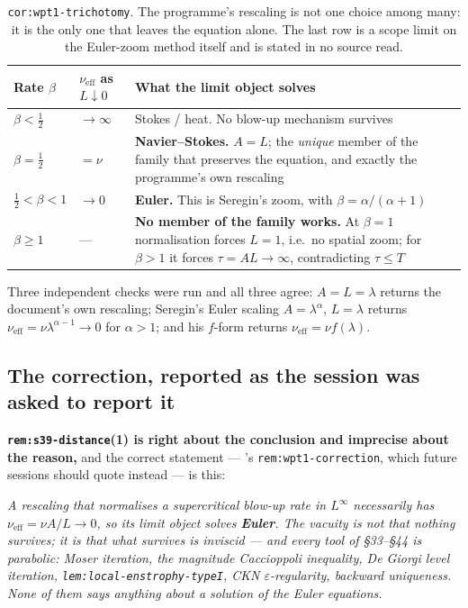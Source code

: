 \begin{table}[ht]
\centering
\small
\begin{tabular}{@{}l l p{}@{}}
\toprule
Rate \(\beta\) & \(\nu_{\mathrm{eff}}\) as \(L\downarrow0\) & What the limit
  object solves \\
\midrule
\(\beta<\tfrac12\) & \(\to\infty\)
  & Stokes / heat. No blow-up mechanism survives \\[3pt]
\(\beta=\tfrac12\) & \(=\nu\)
  & \textbf{Navier--Stokes.} \(A=L\); the \emph{unique} member of the family
    that preserves the equation, and exactly the programme's own rescaling \\[3pt]
\(\tfrac12<\beta<1\) & \(\to0\)
  & \textbf{Euler.} This is Seregin's zoom, with \(\beta=\alpha/(\alpha+1)\) \\[3pt]
\(\beta\geq1\) & ---
  & \textbf{No member of the family works.} At \(\beta=1\) normalisation forces
    \(L=1\), i.e.\ no spatial zoom; for \(\beta>1\) it forces
    \(\tau=AL\to\infty\), contradicting \(\tau\leq T\) \\
\bottomrule
\end{tabular}
\caption[The rescaling trichotomy]{\texttt{cor:wpt1-trichotomy}. The
programme's rescaling is not one choice among many: it is the only one that
leaves the equation alone. The last row is a scope limit on the Euler-zoom
method itself and is stated in no source  read.}
\label{tab:pt-trichotomy}
\end{table}

Three independent checks were run and all three agree: \(A=L=\lambda\) returns
the document's own rescaling; Seregin's Euler scaling \(A=\lambda^\alpha\),
\(L=\lambda\) returns \(\nu_{\mathrm{eff}}=\nu\lambda^{\alpha-1}\to0\) for
\(\alpha>1\); and his \(f\)-form returns \(\nu_{\mathrm{eff}}=\nu f(\lambda)\).

\subsection{The correction, reported as the session was asked to report it}

\begin{record}
\textbf{\texttt{rem:s39-distance}(1) is right about the conclusion and
imprecise about the reason,} and the correct statement --- 's
\texttt{rem:wpt1-correction}, which future sessions should quote instead --- is
this:

\smallskip
\emph{A rescaling that normalises a supercritical blow-up rate in \(L^\infty\)
necessarily has \(\nu_{\mathrm{eff}}=\nu A/L\to0\), so its limit object solves
\textbf{Euler}. The vacuity is not that nothing survives; it is that what
survives is \emph{inviscid} --- and every tool of \S33--\S44 is parabolic:
Moser iteration, the magnitude Caccioppoli inequality, De Giorgi level
iteration, \texttt{lem:local-enstrophy-typeI}, CKN \(\varepsilon\)-regularity,
backward uniqueness. None of them says anything about a solution of the Euler
equations.}
\end{record}


